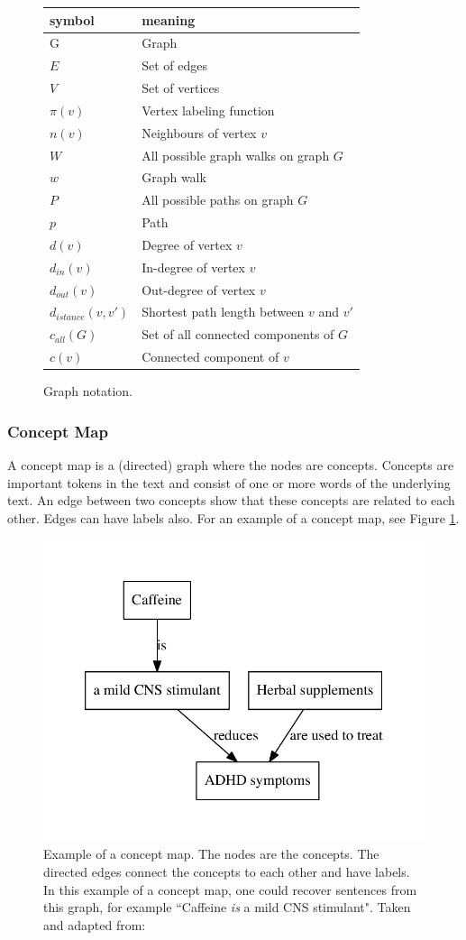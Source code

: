 \begin{figure}[ht]
\centering
\begin{tabular}{ll}
symbol &  meaning \\
\midrule
G & Graph \\
$E$ & Set of edges \\
$V$ & Set of vertices \\
$\pi(v)$ & Vertex labeling function \\
$n(v)$ & Neighbours of vertex $v$ \\
$W$ & All possible graph walks on graph $G$ \\
$w$ & Graph walk \\
$P$ & All possible paths on graph $G$ \\
$p$ & Path \\
$d(v)$ & Degree of vertex $v$ \\
$d_{in}(v)$ & In-degree of vertex $v$ \\
$d_{out}(v)$ & Out-degree of vertex $v$ \\
$d_{istance}(v, v')$ & Shortest path length between $v$ and $v'$ \\
$c_{all}(G)$ & Set of all connected components of $G$ \\
$c(v)$ & Connected component of $v$ \\
\end{tabular}
\caption{Graph notation.}
\end{figure}

\subsubsection{Concept Map}
A concept map is a (directed) graph where the nodes are concepts.
Concepts are important tokens in the text and consist of one or more words of the underlying text.
An edge between two concepts show that these concepts are related to each other. Edges can have labels also.
For an example of a concept map, see Figure \ref{fig:concept_map}.

\begin{figure}[ht]
\centering
\includegraphics[width=0.5\linewidth]{assets/figures/concept_map.pdf}
\caption{Example of a concept map. The nodes are the concepts. The directed edges connect the concepts to each other and have labels. In this example of a concept map, one could recover sentences from this graph, for example ``Caffeine \textit{is} a mild CNS stimulant". Taken and adapted from: \cite{Falke2017}}
\label{fig:concept_map}
\end{figure}

